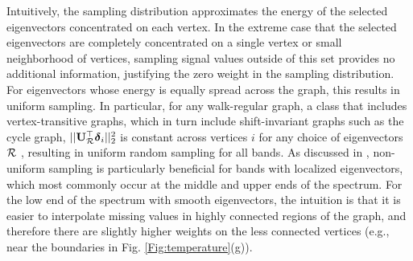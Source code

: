 \documentclass[journal, 10pt]{IEEEtran}
\begin{document}
Intuitively, the sampling distribution approximates the energy of the selected eigenvectors concentrated on each vertex. In the extreme case that the selected eigenvectors are completely concentrated on a single vertex or small neighborhood of vertices, sampling signal values outside of this set provides no additional information, justifying the zero weight in the sampling distribution. For eigenvectors whose energy is equally spread across the graph, this results in uniform sampling. In particular, for any walk-regular graph, a class that includes vertex-transitive graphs, which in turn include shift-invariant graphs such as the cycle graph, $||{\bf U}_{{\cal R}}^{\top} {\boldsymbol \delta}_i ||_2^2$ is constant across vertices $i$ for any choice of eigenvectors ${\cal R}$ \cite[Corollary 3.2]{chan1997symmetry}, resulting in uniform random sampling for all bands. %
As discussed in \cite[Section 5.1.2]{PuyTGV15}, non-uniform sampling is particularly beneficial for bands with localized eigenvectors, %
 which most commonly occur at the middle and upper ends of the spectrum. %
 For the low end of the spectrum with smooth eigenvectors, the intuition is that it is easier to interpolate missing values in highly connected regions of the graph, and therefore there are slightly higher weights on the less connected vertices (e.g., near the boundaries in Fig. \ref{Fig:temperature}(g)).
\end{document}
